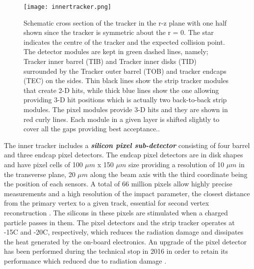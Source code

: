 \begin{figure}[ht]
	\centering
	\texttt{[image: innertracker.png]}
	\vspace{2mm}
	\caption[Schematic cross section of the tracker in the r-z plane with one half shown since the tracker is symmetric about the r = 0. The star indicates the centre of the tracker and the expected collision point. The detector modules are kept in green dashed lines, namely; Tracker inner barrel (TIB) and Tracker inner disks (TID) surrounded by the Tracker outer barrel (TOB) and tracker endcaps (TEC) on the sides. Thin black lines show the strip tracker modules that create 2-D hits, while thick blue lines show the one allowing providing 3-D hit positions which is actually two back-to-back strip modules. The pixel modules provide 3-D hits and they are shown in red curly lines. Each module in a given layer is shifted slightly cover all the gaps providing best acceptance.]{Schematic cross section of the tracker in the r-z plane with one half shown since the tracker is symmetric about the r = 0. The star indicates the centre of the tracker and the expected collision point. The detector modules are kept in green dashed lines, namely; Tracker inner barrel (TIB) and Tracker inner disks (TID) surrounded by the Tracker outer barrel (TOB) and tracker endcaps (TEC) on the sides. Thin black lines show the strip tracker modules that create 2-D hits, while thick blue lines show the one allowing providing 3-D hit positions which is actually two back-to-back strip modules. The pixel modules provide 3-D hits and they are shown in red curly lines. Each module in a given layer is shifted slightly to cover all the gaps providing best acceptance.\cite{innertracker}.}
	\label{innertracker}
\end{figure}

The inner tracker includes a \textbf{\emph{silicon pixel sub-detector}} consisting of four barrel and three endcap pixel detectors. The endcap pixel detectors are in disk shapes and have pixel cells of 100 $\mu m$ x 150 $\mu m$ size providing a resolution of 10 $\mu m$ in the transverse plane, 20 $\mu m$ along the beam axis with the third coordinate being the position of each sensors. A total of 66 million pixels \cite{innertracker} allow highly precise measurements and a high resolution of the impact parameter, the closest distance from the primary vertex to a given track, essential for second vertex reconstruction \cite{innertracker2}. The silicons in these pixels are stimulated when a charged particle passes in them. The pixel detectors and the strip tracker operates at -15\textdegree C and -20\textdegree C, respectively, which reduces the radiation damage and dissipates the heat generated by the on-board electronics. An upgrade of the pixel detector has been performed during the technical stop in 2016 in order to retain its performance which reduced due to radiation damage \cite{tracker3}.

